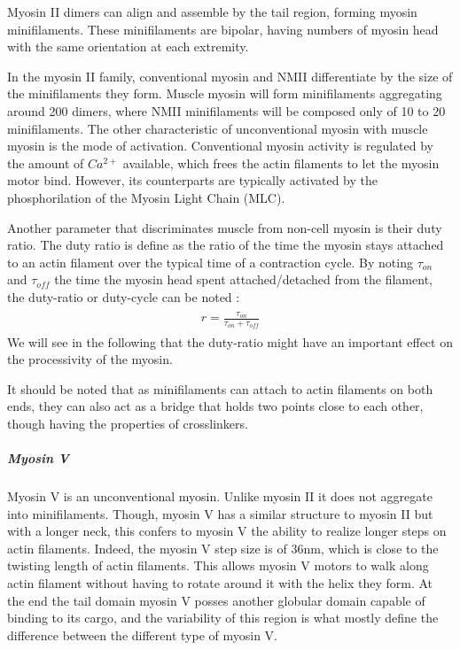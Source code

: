 \documentclass[A4paperpaper,11pt,english]{sphinxmanual}
\begin{document}
Myosin II dimers can align and assemble by the tail region, forming myosin
minifilaments. These minifilaments are bipolar, having numbers of myosin head
with the same orientation at each extremity.

In the myosin II family, conventional myosin and NMII differentiate by the
size of the minifilaments they form. Muscle myosin will form minifilaments
aggregating around 200 dimers, where NMII minifilaments will be composed  only
of 10 to 20 minifilaments. The other characteristic of unconventional myosin
with muscle myosin is the mode of activation. Conventional myosin activity is
regulated by the amount of \(Ca^{2+}\) available, which frees the actin filaments to let the myosin motor bind. However, its
counterparts are typically activated by the phosphorilation of the Myosin Light Chain (MLC).

Another parameter that discriminates muscle from non-cell myosin is their duty
ratio.  The duty ratio is define as the ratio of the time the myosin stays
attached to an actin filament over the typical time of a contraction cycle.
By noting \(\tau_{on}\) and \(\tau_{off}\) the time the myosin head
spent attached/detached from  the filament, the duty-ratio or duty-cycle can
be noted :
\label{parts/part1:equation-roa2}\begin{gather}
\begin{split}r = \frac{\tau_{on}}{\tau_{on}+\tau_{off}}\end{split}\label{parts/part1-roa2}
\end{gather}
We will see in the following that the duty-ratio might have an important effect
on the processivity of the myosin.

It should be noted that as minifilaments can attach to actin filaments on both
ends, they can also act as a bridge that holds two points close to each other,
though having the properties of crosslinkers.


\subparagraph{Myosin V}
\label{parts/part1:myosin-v}
Myosin V is an unconventional myosin. Unlike myosin II it does not aggregate
into minifilaments.  Though, myosin V has a similar structure to myosin II but
with a longer neck, this confers to myosin V the ability to realize longer
steps on actin filaments. Indeed, the myosin V step size is of 36nm, which is close to the
twisting length of actin filaments. This allows myosin V motors to walk along
actin filament without having to rotate around it with the helix they form. At the end the tail domain
myosin V posses another globular domain capable of binding to its cargo, and
the variability of this region is what mostly define the difference between the
different type of myosin V.
\end{document}
